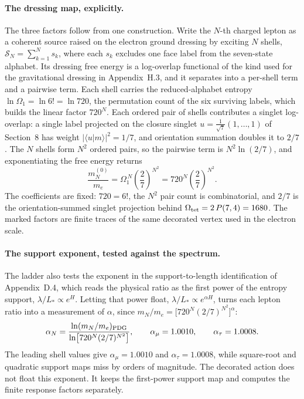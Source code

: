 \documentclass[11pt]{article}
\begin{document}
\paragraph{The dressing map, explicitly.}
The three factors follow from one construction. Write the $N$-th charged lepton as a coherent source raised on the electron ground dressing by exciting $N$ shells, $\mathcal S_N=\sum_{k=1}^{N}s_k$, where each $s_k$ excludes one face label from the seven-state alphabet. Its dressing free energy is a log-overlap functional of the kind used for the gravitational dressing in Appendix~H.3, and it separates into a per-shell term and a pairwise term. Each shell carries the reduced-alphabet entropy $\ln\Omega_1=\ln 6!=\ln 720$, the permutation count of the six surviving labels, which builds the linear factor $720^N$. Each ordered pair of shells contributes a singlet log-overlap: a single label projected on the closure singlet $u=\tfrac1{\sqrt7}(1,\dots,1)$ of Section~8 has weight $|\langle u|m\rangle|^2=1/7$, and orientation summation doubles it to $2/7$. The $N$ shells form $N^2$ ordered pairs, so the pairwise term is $N^2\ln(2/7)$, and exponentiating the free energy returns
\[
\frac{m_N^{(0)}}{m_e}=\Omega_1^{\,N}\left(\frac{2}{7}\right)^{N^2}=720^N\left(\frac{2}{7}\right)^{N^2}.
\]
The coefficients are fixed: $720=6!$, the $N^2$ pair count is combinatorial, and $2/7$ is the orientation-summed singlet projection behind $\Omega_{\rm tet}=2\,P(7,4)=1680$. The marked factors are finite traces of the same decorated vertex used in the electron scale.

\paragraph{The support exponent, tested against the spectrum.}
The ladder also tests the exponent in the support-to-length identification of Appendix~D.4, which reads the physical ratio as the first power of the entropy support, $\lambda/L_*\propto e^{H}$. Letting that power float, $\lambda/L_*\propto e^{\alpha H}$, turns each lepton ratio into a measurement of $\alpha$, since $m_N/m_e=\bigl[720^N(2/7)^{N^2}\bigr]^{\alpha}$:
\[
\alpha_N=\frac{\ln(m_N/m_e)_{\rm PDG}}{\ln\bigl[720^N(2/7)^{N^2}\bigr]},
\qquad
\alpha_\mu=1.0010,
\qquad
\alpha_\tau=1.0008.
\]
The leading shell values give $\alpha_\mu=1.0010$ and $\alpha_\tau=1.0008$, while square-root and quadratic support maps miss by orders of magnitude. The decorated action does not float this exponent. It keeps the first-power support map and computes the finite response factors separately.
\end{document}
